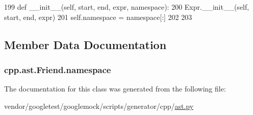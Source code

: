 \begin{DoxyCode}
199     \textcolor{keyword}{def }\_\_init\_\_(self, start, end, expr, namespace):
200         Expr.\_\_init\_\_(self, start, end, expr)
201         self.namespace = namespace[:]
202 
203 
\end{DoxyCode}


\subsection{Member Data Documentation}
\subsubsection[{\texorpdfstring{namespace}{namespace}}]{\setlength{\rightskip}{0pt plus 5cm}cpp.\+ast.\+Friend.\+namespace}\hypertarget{classcpp_1_1ast_1_1Friend_a076c68dddae9bd1e24d224d005538014}{}\label{classcpp_1_1ast_1_1Friend_a076c68dddae9bd1e24d224d005538014}


The documentation for this class was generated from the following file\+:\begin{DoxyCompactItemize}
\item 
vendor/googletest/googlemock/scripts/generator/cpp/\hyperlink{ast_8py}{ast.\+py}\end{DoxyCompactItemize}
